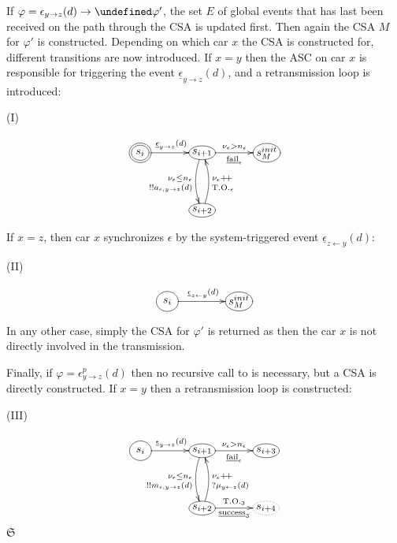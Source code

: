 \documentclass{sig-alternate}
\let\next\undefined
\DeclareMathOperator{\next}{\mathop\bigcirc}
\renewcommand{\v}{\varphi}
\newcommand{\e}{\epsilon}
\newcommand{\Synth}{\mathfrak{S}}
\newcommand{\timeout}{\mathrm{T.O.}}
\newcommand{\locev}[1]{\underline{#1}}
\newcommand{\success}{\locev{\mathrm{success}}}
\newcommand{\fail}{\locev{\mathrm{fail}}}
\newcommand{\glob}[4]{{#1}_{{#2} \rightarrow {#3}}(#4)}
\newcommand{\env}[4]{\locev{#1}_{{#2} \rightarrow {#3}}(#4)}
\newcommand{\sys}[4]{\locev{#1}_{{#2} \leftarrow {#3}}(#4)}
\begin{document}
If $\v = \glob{\e}{y}{z}{d} \rightarrow \next \v'$, the set $E$ of global events that has last been received on the path through the CSA is updated first. Then again the CSA $M$ for $\v'$ is constructed. Depending on which car $x$ the CSA is constructed for, different transitions are now introduced. If $x = y$ then the ASC on car $x$ is responsible for triggering the event $\env{\e}{y}{z}{d}$, and a retransmission loop is introduced:

\begin{minipage}{0.1\textwidth}
(I)
\end{minipage}
\begin{minipage}{0.2\textwidth}
\begin{equation*}
\xymatrix@C=1.2cm@R=1.3cm{ *++[o][F=]{s_i} \ar[r]^{\env{\e}{y}{z}{d}}
     & *+[o][F-]{s_{i+1}} \ar[r]_{\fail_{\e}}^{\nu_{\e} > n_{\e}} \ar@/_/[d]_(.6){!!a_{\e, y \rightarrow z}(d)}_(.45){\nu_{\e} \leq n_{\e}} & *+[o][F-]{s^{init}_{M}}\\
       & *+[o][F-]{s_{i+2}} \ar@/_/[u]_(.4){\timeout_{\e}}_(.55){\nu_{\e}+\!+} & }
\end{equation*}
\end{minipage}

\noindent If $x = z$, then car $x$ synchronizes $\e$ by the system-triggered event $\sys{\e}{z}{y}{d}$:

\begin{minipage}{0.1\textwidth}
(II)
\end{minipage}
\begin{minipage}{0.2\textwidth}
\begin{equation*}
\xymatrix@C=1.5cm@R=1.3cm{*++[o][F-]{s_i} \ar[r]^{\sys{\e}{z}{y}{d}} & *+[o][F-]{s^{init}_M}}
\label{eq:2}
\end{equation*}
\end{minipage}

\noindent In any other case, simply the CSA for $\v'$ is returned as then the car $x$ is not directly involved in the transmission.

Finally, if $\v = \e_{y \rightarrow z}^p(d)$ then no recursive call to {} is necessary, but a CSA is directly constructed. If $x = y$ then a retransmission loop is constructed:

\begin{minipage}{0.1\textwidth}
(III)
\end{minipage}
\begin{minipage}{0.2\textwidth}
\begin{equation*}
\xymatrix@C=1.2cm@R=1.3cm{ *++[o][F-]{s_i} \ar[r]^{\env{\e}{y}{z}{d}}
     & *+[o][F-]{s_{i+1}} \ar[r]_{\fail_{\e}}^{\nu_{\e} > n_{\e}} \ar@/_/[d]_(.6){!!m_{\e, y \rightarrow z}(d)}_(.45){\nu_{\e} \leq n_{\e}} & *+[o][F-]{s_{i+3}}\\
       & *+[o][F-]{s_{i+2}} \ar@/_/[u]_(.4){?\mu_{y \leftarrow z}(d)}_(.55){\nu_{\e}+\!+} \ar[r]^{\timeout_3}="?b"_{\success_3}="success3" & *+[o][F.]{s_{i+4}}}
\label{eq:3}
\end{equation*}$\Synth$
\end{minipage}
\end{document}
